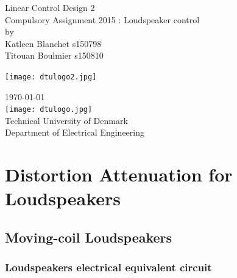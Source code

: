 \documentclass[12pt,a4paper,fleqn, onesside]{report}
\begin{document}
\begin{titlepage}
\begin{center}
\vspace{4cm}
\Huge{ Linear Control Design 2}\\
\vspace{0.8cm}
\large{\sc Compulsory Assignment 2015 : Loudspeaker control\\}
\vspace{1.2cm}
\normalsize{by}\\
\vspace{1.2cm}
{\sc
\large Katleen Blanchet s150798  \\ 
Titouan Boulmier s150810\\
}
\vspace{2cm}
\begin{center}
\texttt{[image: dtulogo2.jpg]}
\end{center} 
\vspace{3.1cm}
\normalsize{\today}\\
\vspace{1.37cm}
\texttt{[image: dtulogo.jpg]}\\
\vspace{0.2cm}
\normalsize{Technical University of Denmark \\ Department of Electrical Engineering \\
}
\end{center}
\end{titlepage}
\thispagestyle{empty}

\pagebreak
{}
\setcounter{page}{1}
\setcounter{tocdepth}{4}
\setcounter{secnumdepth}{4} 
\tableofcontents
\newpage
{}
\def\chaptername{Exercice}


\chapter{Distortion Attenuation for Loudspeakers}
\section{Moving-coil Loudspeakers}
\subsection{Loudspeakers electrical equivalent circuit}
\end{document}
